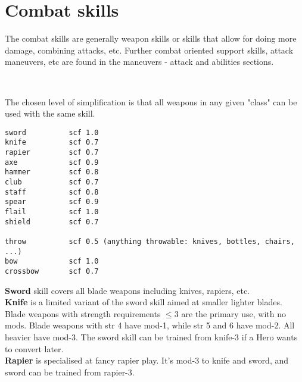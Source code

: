 
\section*{Combat skills}

The combat skills are generally weapon skills or skills that allow for doing more damage, combining attacks, etc. Further combat oriented support skills, attack maneuvers, etc are found in the maneuvers - attack and abilities sections.

\

\openskillslist

\begin{samepage}
 The chosen level of simplification is that all weapons in any given "class" can be used with the same skill.

\begin{verbatim}
sword          scf 1.0
knife          scf 0.7
rapier         scf 0.7
axe            scf 0.9
hammer         scf 0.8
club           scf 0.7
staff          scf 0.8
spear          scf 0.9
flail          scf 1.0
shield         scf 0.7

throw          scf 0.5 (anything throwable: knives, bottles, chairs, ...)
bow            scf 1.0
crossbow       scf 0.7
\end{verbatim}
\end{samepage}

\textbf{Sword} skill covers all blade weapons including knives, rapiers, etc. \\
\textbf{Knife} is a limited variant of the sword skill aimed at smaller lighter blades. Blade weapons with strength requirements $\leq$3 are the primary use, with no mods. Blade weapons with str 4 have mod-1, while str 5 and 6 have mod-2. All heavier have mod-3. The sword skill can be trained from knife-3 if a Hero wants to convert later.\\
\textbf{Rapier} is specialised at fancy rapier play. It's mod-3 to knife and sword, and sword can be trained from rapier-3.

